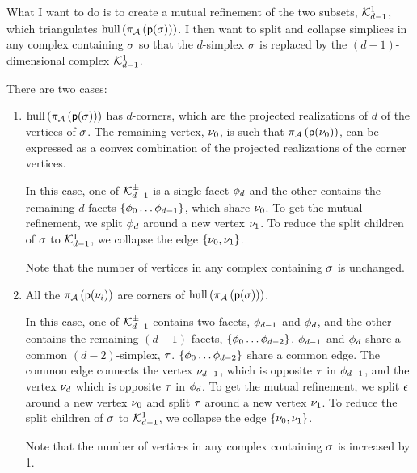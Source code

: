 What I want to do is to create a mutual refinement of the two subsets,
$\mathcal{K}_{d-1}^{1}$,
which triangulates
$\convex_span \left( \Projection_{\Aspace} \left( \p ( \Ssimplex ) \right) \right)$.
I then want to split and collapse simplices in any complex containing $\sigma$
so that the $d$-simplex $\sigma$ is replaced by the $(d-1)$-dimensional
complex $\mathcal{K}_{d-1}^{1}$.

There are two cases:
\begin{enumerate}

\item $\convex_span \left( \Projection_{\Aspace} \left( \p ( \Ssimplex ) \right) \right)$
has $d$-corners, which are the projected realizations of $d$
of the vertices of $\sigma$.
The remaining vertex, $\nu_0$,
is such that
$\pi_{\mathcal{A}} \left( \mathsf{p} ( \nu_0 ) \right)$,
can be expressed
as a convex combination of the projected realizations of the corner vertices.

In this case, one of $\mathcal{K}_{d-1}^{\pm}$ is a single facet $\phi_d$
and the other contains the remaining $d$ facets $\{\phi_0 \ldots \phi_{d-1} \}$,
which share $\nu_0$.
To get the mutual refinement, we split $\phi_d$ around a new vertex $\nu_1$.
To reduce the split children of $\sigma$ to $\mathcal{K}_{d-1}^{1}$,
we collapse the edge $\{ \nu_0 , \nu_1 \}$.

Note that the number of vertices in any complex containing $\sigma$
is unchanged.

\item All the $\pi_{\mathcal{A}} \left( \mathsf{p} ( \nu_i ) \right) $
are corners of
$\convex_span \left( \Projection_{\Aspace} \left( \p ( \Ssimplex ) \right) \right)$.

In this case, one of $\mathcal{K}_{d-1}^{\pm}$
contains two facets, $\phi_{d-1}$ and $\phi_{d}$,
and the other contains the remaining $(d-1)$ facets, $\{\phi_0 \ldots \phi_{d-2} \}$.
$\phi_{d-1}$ and $\phi_{d}$ share a common $(d-2)$-simplex, $\tau$.
$\{\phi_0 \ldots \phi_{d-2} \}$ share a common edge.
The common edge connects the vertex $\nu_{d-1}$,
which is opposite $\tau$ in $\phi_{d-1}$,
and the vertex $\nu_{d}$
which is opposite $\tau$ in $\phi_{d}$.
To get the mutual refinement, we split $\epsilon$ around a new vertex $\nu_0$
and split $\tau$ around a new vertex $\nu_1$.
To reduce the split children of $\sigma$ to $\mathcal{K}_{d-1}^{1}$,
we collapse the edge $\{ \nu_0 , \nu_1 \}$.

Note that the number of vertices in any complex containing $\sigma$
is increased by 1.

\end{enumerate}








